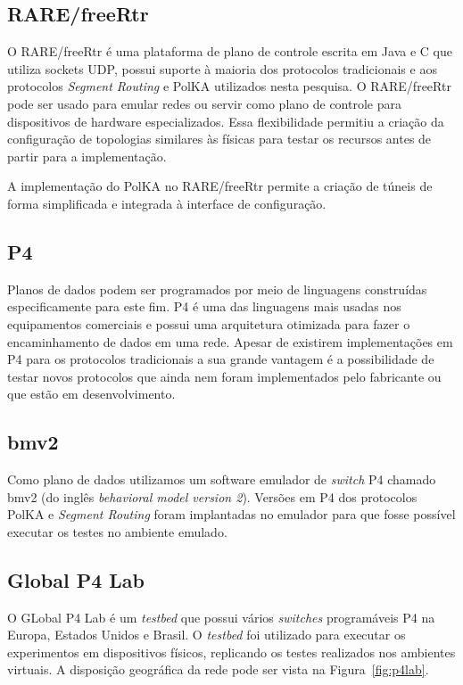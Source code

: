 \documentclass[12pt]{article}
\begin{document}
\subsection{RARE/freeRtr}

O RARE/freeRtr é uma plataforma de plano de controle escrita em Java e C que utiliza sockets UDP, possui suporte à maioria dos protocolos tradicionais e aos protocolos \textit{Segment Routing} e PolKA utilizados nesta pesquisa. O RARE/freeRtr pode ser usado para emular redes ou servir como plano de controle para dispositivos de hardware especializados. Essa flexibilidade permitiu a criação da configuração de topologias similares às físicas para testar os recursos antes de partir para a implementação.

A implementação do PolKA no RARE/freeRtr permite a criação de túneis de forma simplificada e integrada à interface de configuração.

\subsection{P4}

Planos de dados podem ser programados por meio de linguagens construídas especificamente para este fim. P4 é uma das linguagens mais usadas nos equipamentos comerciais e possui uma arquitetura otimizada para fazer o encaminhamento de dados em uma rede. Apesar de existirem implementações em P4 para os protocolos tradicionais a sua grande vantagem é a possibilidade de testar novos protocolos que ainda nem foram implementados pelo fabricante ou que estão em desenvolvimento.

\subsection{bmv2}

Como plano de dados utilizamos um software emulador de \textit{switch} P4 chamado bmv2 (do inglês \textit{behavioral model version 2}). Versões em P4 dos protocolos PolKA e \textit{Segment Routing} foram implantadas no emulador para que fosse possível executar os testes no ambiente emulado.

\subsection{Global P4 Lab}

O GLobal P4 Lab é um \textit{testbed} que possui vários \textit{switches} programáveis P4 na Europa, Estados Unidos e Brasil. O \textit{testbed} foi utilizado para executar os experimentos em dispositivos físicos, replicando os testes realizados nos ambientes virtuais. A disposição geográfica da rede pode ser vista na Figura~\ref{fig:p4lab}.
\end{document}
